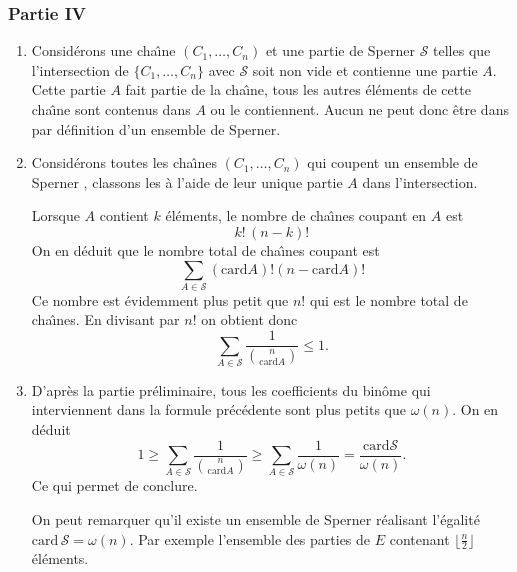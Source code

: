 \subsubsection*{Partie IV}
\begin{enumerate}
\item Considérons une cha{\^\i}ne $(C_1,\ldots,C_n)$ et une partie de Sperner $\mathcal{S}$ telles que l'intersection de $\{C_1,\ldots,C_n\}$ avec $\mathcal{S}$ soit non vide et contienne une partie $A$. Cette partie $A$ fait partie de la cha{\^\i}ne, tous les autres {\'e}l{\'e}ments de cette cha{\^\i}ne sont contenus dans $A$ ou le contiennent. Aucun ne peut donc {\^e}tre dans  par d{\'e}finition d'un ensemble de Sperner.
\item
Consid{\'e}rons toutes les cha{\^\i}nes $(C_1,\ldots,C_n)$ qui coupent un ensemble de Sperner , classons les {\`a} l'aide de leur unique partie $A$ dans l'intersection.

Lorsque $A$ contient $k$ {\'e}l{\'e}ments, le nombre de cha{\^\i}nes coupant  en $A$ est $$k!\,(n-k)!$$
On en d{\'e}duit que le nombre total de cha{\^\i}nes coupant  est
$$\sum_{A\in \mathcal{S}}(\mathrm{card}A)!(n-\mathrm{card}A)!$$
Ce nombre est {\'e}videmment plus petit que $n!$ qui est le nombre total de cha{\^\i}nes. En divisant par $n!$ on obtient donc
$$\sum_{A\in \mathcal{S}}\frac{1}{\binom{n}{\mathrm{card}A }} \leq 1 .$$
\item
D'apr{\`e}s la partie pr{\'e}liminaire, tous les coefficients du bin{\^o}me qui interviennent dans la formule pr{\'e}c{\'e}dente sont plus petits que $\omega (n)$. On en d{\'e}duit
\begin{displaymath}
  1 \geq \sum_{A\in \mathcal{S}}\dfrac{1} {\binom{n}{\mathrm{card}A }} 
\geq \sum_{A\in \mathcal{S}}\dfrac{1}{\omega (n)}
=\dfrac{\mathrm{card}\mathcal{S}}{\omega (n)}.
\end{displaymath}
Ce qui permet de conclure.

On peut remarquer qu'il existe un ensemble de Sperner r{\'e}alisant l'{\'e}galit{\'e} $\mathrm{card}\,\mathcal{S}=\omega(n)$. Par exemple l'ensemble des parties de $E$ contenant  $\lfloor\frac{n}{2}\rfloor$ {\'e}l{\'e}ments.
\end{enumerate}
